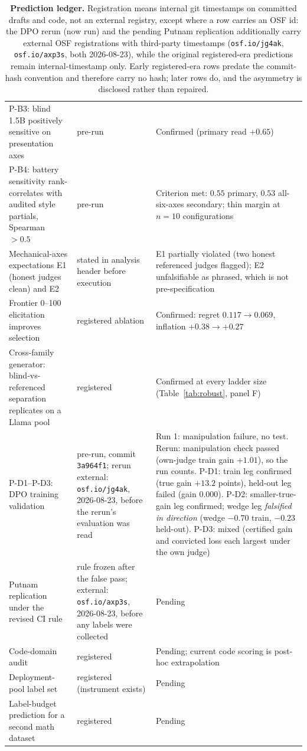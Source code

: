 \begin{table}[ht]
\begin{tabular}{p{5.6cm}p{3.6cm}p{5.4cm}}
P-B3: blind 1.5B positively sensitive on presentation axes & pre-run & Confirmed (primary read $+0.65$) \\
P-B4: battery sensitivity rank-correlates with audited style partials, Spearman $> 0.5$ & pre-run & Criterion met: $0.55$ primary, $0.53$ all-six-axes secondary; thin margin at $n{=}10$ configurations \\
Mechanical-axes expectations E1 (honest judges clean) and E2 & stated in analysis header before execution & E1 partially violated (two honest referenced judges flagged); E2 unfalsifiable as phrased, which is not pre-specification \\
Frontier 0--100 elicitation improves selection & registered ablation & Confirmed: regret $0.117 \to 0.069$, inflation $+0.38 \to +0.27$ \\
Cross-family generator: blind-vs-referenced separation replicates on a Llama pool & registered & Confirmed at every ladder size (Table~\ref{tab:robust}, panel F) \\
P-D1--P-D3: DPO training validation & pre-run, commit \texttt{3a964f1}; rerun external: \texttt{osf.io/jg4ak}, 2026-08-23, before the rerun's evaluation was read & Run 1: manipulation failure, no test. Rerun: manipulation check passed (own-judge train gain $+1.01$), so the run counts. P-D1: train leg confirmed (true gain $+13.2$ points), held-out leg failed (gain $0.000$). P-D2: smaller-true-gain leg confirmed; wedge leg \emph{falsified in direction} (wedge $-0.70$ train, $-0.23$ held-out). P-D3: mixed (certified gain and convicted loss each largest under the own judge) \\
Putnam replication under the revised CI rule & rule frozen after the false pass; external: \texttt{osf.io/axp3s}, 2026-08-23, before any labels were collected & Pending \\
Code-domain audit & registered & Pending; current code scoring is post-hoc extrapolation \\
Deployment-pool label set & registered (instrument exists) & Pending \\
Label-budget prediction for a second math dataset & registered & Pending \\
\bottomrule
\end{tabular}
\caption{\textbf{Prediction ledger.}
Registration means internal git timestamps on committed drafts and code, not an external registry, except where a row carries an OSF id: the DPO rerun (now run) and the pending Putnam replication additionally carry external OSF registrations with third-party timestamps (\texttt{osf.io/jg4ak}, \texttt{osf.io/axp3s}, both 2026-08-23), while the original registered-era predictions remain internal-timestamp only.
Early registered-era rows predate the commit-hash convention and therefore carry no hash; later rows do, and the asymmetry is disclosed rather than repaired.}
\label{tab:ledger}
\end{table}

